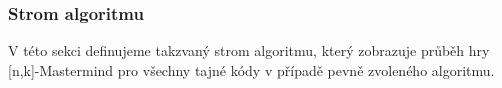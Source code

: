 








 




\subsubsection{Strom algoritmu}
V této sekci definujeme takzvaný strom algoritmu, který zobrazuje průběh hry [n,k]-Mastermind pro všechny tajné kódy v případě pevně zvoleného algoritmu. 

